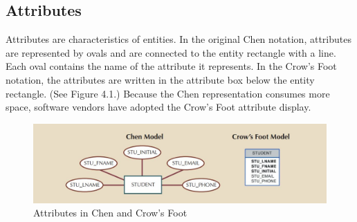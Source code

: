 \documentclass[a4paper, 12pt, titlepage]{report}
\begin{document}
{\subsection{Attributes}
Attributes are characteristics of entities. In the original Chen notation, attributes are represented by ovals and are connected to the entity rectangle with a line. Each oval contains the name of the attribute it represents. In the Crow’s Foot notation, the attributes are written in the attribute box below the entity rectangle. (See Figure 4.1.) Because the Chen representation consumes more space, software vendors have adopted the Crow’s Foot attribute display.
\begin{figure}[H]
\centering
\includegraphics[scale=0.5]{Attr}
\caption{Attributes in Chen and Crow's Foot}
\end{figure}

}
\end{document}
